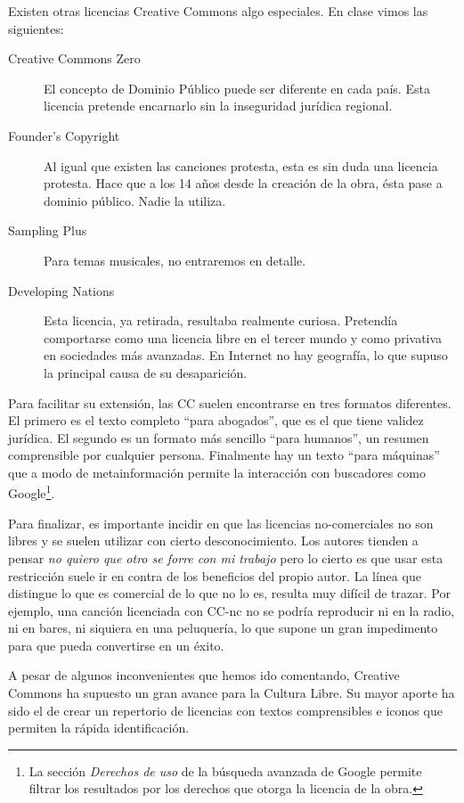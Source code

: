 Existen otras licencias Creative Commons algo especiales. En clase
vimos las siguientes:
\begin{description}
\item[Creative Commons Zero] El concepto de Dominio Público puede ser
  diferente en cada país. Esta licencia pretende encarnarlo sin la
  inseguridad jurídica regional.
\item[Founder's Copyright] Al igual que existen las canciones
  protesta, esta es sin duda una licencia protesta. Hace que a los 14
  años desde la creación de la obra, ésta pase a dominio
  público. Nadie la utiliza.
\item[Sampling Plus] Para temas musicales, no entraremos en detalle.
\item[Developing Nations] Esta licencia, ya retirada, resultaba
  realmente curiosa. Pretendía comportarse como una licencia libre en
  el tercer mundo y como privativa en sociedades más avanzadas. En
  Internet no hay geografía, lo que supuso la principal causa de su
  desaparición.
\end{description}

Para facilitar su extensión, las CC suelen encontrarse en tres
formatos diferentes. El primero es el texto completo ``para
abogados'', que es el que tiene validez jurídica. El segundo es un
formato más sencillo ``para humanos'', un resumen comprensible por
cualquier persona. Finalmente hay un texto ``para máquinas'' que a
modo de metainformación permite la interacción con buscadores como
Google\footnote{La sección \emph{Derechos de uso} de la búsqueda
  avanzada de Google permite filtrar los resultados por los derechos
  que otorga la licencia de la obra.}.

Para finalizar, es importante incidir en que las licencias
no-comerciales no son libres y se suelen utilizar con cierto
desconocimiento. Los autores tienden a pensar \emph{no quiero que otro
  se forre con mi trabajo} pero lo cierto es que usar esta restricción
suele ir en contra de los beneficios del propio autor. La línea que
distingue lo que es comercial de lo que no lo es, resulta muy difícil de
trazar. Por ejemplo, una canción licenciada con CC-nc no se podría
reproducir ni en la radio, ni en bares, ni siquiera en una peluquería,
lo que supone un gran impedimento para que pueda convertirse en un
éxito. 

A pesar de algunos inconvenientes que hemos ido comentando, Creative
Commons ha supuesto un gran avance para la Cultura Libre. Su mayor
aporte ha sido el de crear un repertorio de licencias con textos
comprensibles e iconos que permiten la rápida identificación.
